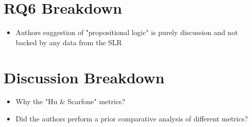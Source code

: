 \section{RQ6 Breakdown}

\begin{itemize}

\item Authors suggestion of "propositional logic" is purely discussion and not backed by any data from the SLR

\end{itemize}


\section{Discussion Breakdown}

\begin{itemize}

\item Why the "Hu \& Scarfone" metrics?

\item Did the authors perform a prior comparative analysis of different metrics?

\end{itemize}
